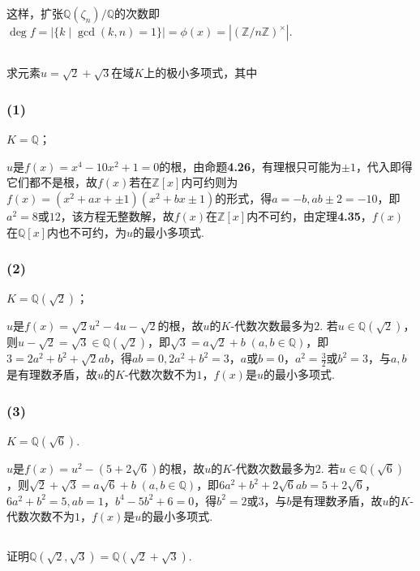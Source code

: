 这样，扩张$\mathbb{Q}(\zeta_n)/\mathbb{Q}$的次数即$\deg f=|\{k\mid\gcd(k,n)=1\}|=\phi(x)=|(\mathbb{Z}/n\mathbb{Z})^{\times}|$. 

\subsection{}
求元素$u=\sqrt{2}+\sqrt{3}$在域$K$上的极小多项式，其中
\subsubsection{(1)}
$K=\mathbb{Q}$；

\jie $u$是$f(x)=x^4-10x^2+1=0$的根，由{\heiti 命题}\textbf{4.26}，有理根只可能为$\pm 1$，代入即得它们都不是根，故$f(x)$若在$\mathbb{Z}[x]$内可约则为$f(x)=(x^2+ax+\pm 1)(x^2+bx\pm 1)$的形式，得$a=-b, ab\pm 2=-10$，即$a^2=8$或$12$，该方程无整数解，故$f(x)$在$\mathbb{Z}[x]$内不可约，由{\heiti 定理}\textbf{4.35}，$f(x)$在$\mathbb{Q}[x]$内也不可约，为$u$的最小多项式.

\subsubsection{(2)}
$K=\mathbb{Q}(\sqrt{2})$；

\jie $u$是$f(x)=\sqrt{2}u^2-4u-\sqrt{2}$的根，故$u$的$K$-代数次数最多为$2$. 若$u\in\mathbb{Q}(\sqrt{2})$，则$u-\sqrt{2}=\sqrt{3}\in\mathbb{Q}(\sqrt{2})$，即$\sqrt{3}=a\sqrt{2}+b\;(a,b\in\mathbb{Q})$，即$3=2a^2+b^2+\sqrt{2}ab$，得$ab=0, 2a^2+b^2=3$，$a$或$b=0$，$a^2=\frac{3}{2}$或$b^2=3$，与$a,b$是有理数矛盾，故$u$的$K$-代数次数不为$1$，$f(x)$是$u$的最小多项式.

\subsubsection{(3)}
$K=\mathbb{Q}(\sqrt{6})$.

\jie $u$是$f(x)=u^2-(5+2\sqrt{6})$的根，故$u$的$K$-代数次数最多为$2$.  若$u\in\mathbb{Q}(\sqrt{6})$，则$\sqrt{2}+\sqrt{3}=a\sqrt{6}+b\;(a,b\in\mathbb{Q})$，即$6a^2+b^2+2\sqrt{6}ab=5+2\sqrt{6}$，$6a^2+b^2=5, ab=1$，$b^4-5b^2+6=0$，得$b^2=2$或$3$，与$b$是有理数矛盾，故$u$的$K$-代数次数不为$1$，$f(x)$是$u$的最小多项式.

\subsection{}
证明$\mathbb{Q}(\sqrt{2},\sqrt{3})=\mathbb{Q}(\sqrt{2}+\sqrt{3})$.


